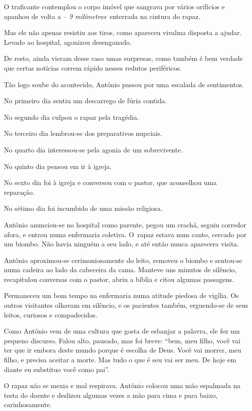 O traficante contemplou o corpo imóvel que sangrava por vários orifícios
e apanhou de volta a \emph{ -- 9 milímetros}~enterrada na cintura do
rapaz.

Mas ele não apenas resistiu aos tiros, como apareceu vivalma disposta a
ajudar. Levado ao hospital, agonizou desenganado.

De resto, ainda vieram desse caso umas surpresas, como também é bem
verdade que certas notícias correm rápido nesses redutos periféricos.

Tão logo soube do acontecido, Antônio passou por uma escalada de
sentimentos.

No primeiro dia sentiu um descarrego de fúria contida.

No segundo dia culpou o rapaz pela tragédia.

No terceiro dia lembrou-se dos preparativos nupciais.

No quarto dia interessou-se pela agonia de um sobrevivente.

No quinto dia pensou em ir à igreja.

No sexto dia foi à igreja e conversou com o pastor, que aconselhou uma
reparação.

No sétimo dia foi incumbido de uma missão religiosa.

\asterisc{}

Antônio anunciou-se no hospital como parente, pegou um crachá, seguiu
corredor afora, e entrou numa enfermaria coletiva. O~rapaz estava num
canto, cercado por um biombo. Não havia ninguém a seu lado, e até então
nunca aparecera visita.

Antônio aproximou-se cerimoniosamente do leito, removeu o biombo e
sentou-se numa cadeira ao lado da cabeceira da cama. Manteve uns minutos
de silêncio, recapitulou conversas com o pastor, abriu a bíblia e citou
algumas passagens.

Permaneceu um bom tempo na enfermaria numa atitude piedosa de vigília.
Os outros visitantes olhavam em silêncio, e os pacientes também,
erguendo-se de seus leitos, curiosos e compadecidos.

Como Antônio vem de uma cultura que gosta de esbanjar a palavra, ele fez
um pequeno discurso. Falou alto, pausado, mas foi breve: ``bem, meu
filho, você vai ter que ir embora deste mundo porque é escolha de Deus.
Você vai morrer, meu filho, e precisa aceitar a morte. Mas tudo o que é
seu vai ser meu. De hoje em diante eu substituo você como pai''.

O rapaz não se mexia e mal respirava. Antônio colocou uma mão espalmada
na testa do doente e deslizou algumas vezes a mão para cima e para
baixo, carinhosamente.

